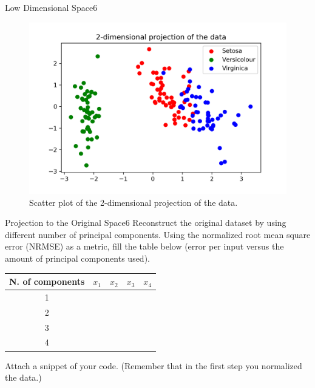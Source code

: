 \begin{questions}
\begin{question}{Low Dimensional Space}{6}
\begin{figure}[h!]
	\includegraphics[width=0.8\linewidth]{pictures/PCA_scatter.png}
	\centering
	\caption{Scatter plot of the 2-dimensional projection of the data.}
	\label{fig:2}
\end{figure}
\end{question}


\begin{question}{Projection to the Original Space}{6}
Reconstruct the original dataset by using different number of principal components. Using the normalized root mean square error (NRMSE) as a metric, fill the table below (error per input versus the amount of principal components used).

\begin{tabular}{c|r|r|r|r}
N. of components & $x_1$ & $x_2$ & $x_3$ & $x_4$ \\
\hline
1 & & & & \\
2 & & & & \\
3 & & & & \\
4 & & & &
\end{tabular}

Attach a snippet of your code.
(Remember that in the first step you normalized the data.)


\end{question}
\end{questions}

